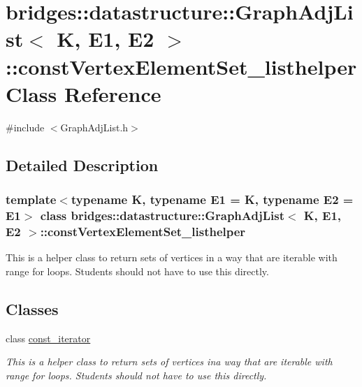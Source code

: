 \hypertarget{classbridges_1_1datastructure_1_1_graph_adj_list_1_1const_vertex_element_set__listhelper}{}\section{bridges\+:\+:datastructure\+:\+:Graph\+Adj\+List$<$ K, E1, E2 $>$\+:\+:const\+Vertex\+Element\+Set\+\_\+listhelper Class Reference}
\label{classbridges_1_1datastructure_1_1_graph_adj_list_1_1const_vertex_element_set__listhelper}


{\ttfamily \#include $<$Graph\+Adj\+List.\+h$>$}



\subsection{Detailed Description}
\subsubsection*{template$<$typename K, typename E1 = K, typename E2 = E1$>$\newline
class bridges\+::datastructure\+::\+Graph\+Adj\+List$<$ K, E1, E2 $>$\+::const\+Vertex\+Element\+Set\+\_\+listhelper}

This is a helper class to return sets of vertices in a way that are iterable with range for loops. Students should not have to use this directly. \subsection*{Classes}
\begin{DoxyCompactItemize}
\item 
class \hyperlink{classbridges_1_1datastructure_1_1_graph_adj_list_1_1const_vertex_element_set__listhelper_1_1const__iterator}{const\+\_\+iterator}
\begin{DoxyCompactList}\small\item\em This is a helper class to return sets of vertices ina way that are iterable with range for loops. Students should not have to use this directly. \end{DoxyCompactList}\end{DoxyCompactItemize}
